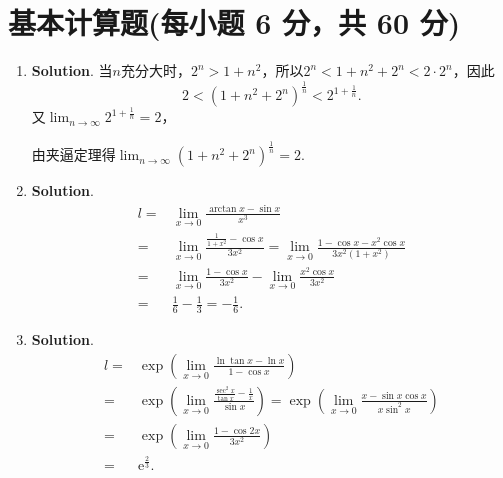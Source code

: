\documentclass[../main.tex]{subfiles}
\begin{document}
\section{基本计算题(每小题 6 分，共 60 分)}
\begin{enumerate}
    \item \textbf{Solution}. 当$n$充分大时，$2^{n}>1+n^{2}$，所以$2^{n}<1+n^{2}+2
                  ^{n}<2\cdot 2^{n}$，因此
          \[
              2<\left(1+n^{2}+2^{n}\right)^{\frac{1}{n}}<2^{1+\frac{1}{n}}.
          \]
          又$\lim_{n\to\infty}2^{1+\frac{1}{n}}=2$，

          由夹逼定理得$\lim_{n\to\infty}\left(1+n^{2}+2^{n}\right)^{\frac{1}{n}}=2$.

    \item \textbf{Solution}.
          \[
              \begin{aligned}
                  l = {} & \lim_{x\to 0}\frac{\arctan x-\sin x}{x^3}                                                          \\
                  = {}   & \lim_{x\to0}\frac{\frac{1}{1+x^2}-\cos x}{3x^2}=\lim_{x\to0}\frac{1-\cos x-x^2\cos x}{3x^2(1+x^2)} \\
                  = {}   & \lim_{x\to0}\frac{1-\cos x}{3x^2}- \lim_{x\to0}\frac{x^2\cos x}{3x^2}                              \\
                  = {}   & \frac{1}{6}-\frac{1}{3}=-\frac{1}{6}.
              \end{aligned}
          \]

    \item \textbf{Solution}.
          \[
              \begin{aligned}
                  l= {} & \exp\left(\lim_{x\to0}\frac{\ln\tan x-\ln x}{1-\cos x}\right)                                                                                 \\
                  = {}  & \exp\left(\lim_{x\to0}\frac{\frac{\sec^2 x}{\tan x}-\frac{1}{x}}{\sin x}\right)=\exp\left(\lim_{x\to0}\frac{x-\sin x\cos x}{x\sin^2 x}\right) \\
                  = {}  & \exp\left(\lim_{x\to0}\frac{1-\cos 2x}{3x^2}\right)                                                                                           \\
                  = {}  & \mathrm{e}^{\frac{2}{3}}.                                                                                                                     \\
              \end{aligned}
          \]


\end{enumerate}
\end{document}
